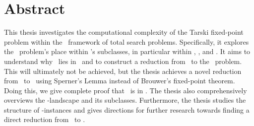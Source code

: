 \chapter*{Abstract}

This thesis investigates the computational complexity of the Tarski fixed-point problem within the \TFNP\ framework of total search problems. Specifically, it explores the \Tarski\ problem's place within \TFNP's subclasses, in particular within \PPAD, \PLS, and \EOPL\@. It aims to understand why \Tarski\ lies in \EOPL\ and to construct a reduction from \Tarski\ to the \EndOfPotentialLine\ problem. This will ultimately not be achieved, but the thesis achieves a novel reduction from \Tarski\ to \EndOfLine\ using Sperner's Lemma instead of Brouwer's fixed-point theorem. Doing this, we give complete proof that \Sperner\ is in \PPAD\@. The thesis also comprehensively overviews the \TFNP-landscape and its subclasses. Furthermore, the thesis studies the structure of \Tarski-instances and gives directions for further research towards finding a direct reduction from \Tarski\ to \EndOfPotentialLine\@.